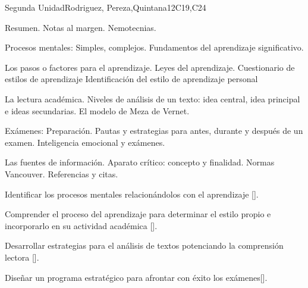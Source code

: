 \begin{syllabus}
\begin{unit}{}{Segunda Unidad}{Rodriguez, Pereza,Quintana}{12}{C19,C24}
\begin{topics}
   \item Resumen. Notas al margen. Nemotecnias.
   \item Procesos mentales: Simples, complejos. Fundamentos del aprendizaje significativo.
   \item Los pasos o factores para el aprendizaje. Leyes del aprendizaje. Cuestionario de estilos de aprendizaje Identificación del estilo de aprendizaje personal
   \item La lectura académica. Niveles de  análisis de un texto: idea central, idea principal e ideas secundarias. El modelo de Meza de Vernet.
   \item Exámenes: Preparación. Pautas y estrategias para antes, durante y después de un examen. Inteligencia emocional y exámenes.
   \item Las fuentes de información. Aparato crítico: concepto y finalidad. Normas Vancouver. Referencias y citas.
\end{topics}
\begin{learningoutcomes}
        \item Identificar los procesos mentales relacionándolos con el aprendizaje [\Usage].
        \item Comprender el proceso del aprendizaje para determinar el estilo propio e incorporarlo en su actividad académica [\Usage].
        \item Desarrollar estrategias para el análisis de textos potenciando la comprensión lectora [\Usage].
        \item Diseñar un programa estratégico para afrontar con éxito los exámenes[\Usage].
\end{learningoutcomes}
\end{unit}


\end{syllabus}
